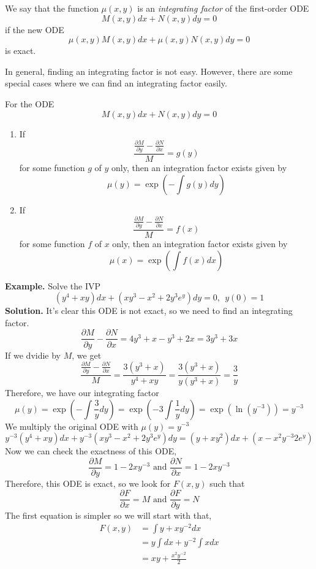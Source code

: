 \documentclass[openany]{report}
\begin{document}
\begin{definition}
    We say that the function $\mu(x,y)$ is an \emph{integrating factor} of the first-order ODE 
    \[M(x,y)dx + N(x,y)dy = 0\]
    if the new ODE
    \[\mu(x,y)M(x,y)dx + \mu(x,y)N(x,y)dy = 0\]
    is exact.
\end{definition}
In general, finding an integrating factor is not easy. However, there are some special cases where we can find an integrating factor easily.
\begin{theorem}
    For the ODE
    \[M(x,y)dx + N(x,y)dy = 0\]
    \begin{enumerate}
        \item If 
        \[\frac{\frac{\partial M}{\partial y} - \frac{\partial N}{\partial x}}{M} = g(y)\]
        for some function $g$ of $y$ only, then an integration factor exists given by 
        \[\mu(y) = \exp \left(-\int g(y)dy\right)\]
        \item If
        \[\frac{\frac{\partial M}{\partial y} - \frac{\partial N}{\partial x}}{M} = f(x)\]
        for some function $f$ of $x$ only, then an integration factor exists given by
        \[\mu(x) = \exp\left(\int f(x)dx\right)\]
    \end{enumerate}
\end{theorem}
\textbf{Example.} Solve the IVP 
\[(y^4 + xy)dx + (xy^3 - x^2 + 2y^3e^y)dy = 0, \ \ y(0) = 1\]
\textbf{Solution.} It's clear this ODE is not exact, so we need to find an integrating factor. 
\[\frac{\partial M}{\partial y} - \frac{\partial N}{\partial x} = 4y^3 + x - y^3 + 2x = 3y^3 + 3x\]
If we dvidie by $M$, we get 
\[\frac{\frac{\partial M}{\partial y} - \frac{\partial N}{\partial x}}{M} = \frac{3(y^3 + x)}{y^4 + xy} = \frac{3(y^3 + x)}{y(y^3 + x)} = \frac{3}{y}\]
Therefore, we have our integrating factor 
\[\mu(y) = \exp \left(-\int \frac{3}{y}dy\right) = \exp\left(-3\int\frac{1}{y}dy\right) = \exp\left(\ln(y^{-3})\right) = y^{-3}\]
We multiply the original ODE with $\mu(y) = y^{-3}$
\[y^{-3}(y^4 + xy)dx + y^{-3}(xy^3 - x^2 + 2y^3e^y)dy = (y + xy^2)dx + (x - x^2y^{-3}2e^y)\]
Now we can check the exactness of this ODE, 
\[\frac{\partial M}{\partial y} = 1 - 2xy^{-3} \text{ and } \frac{\partial N}{\partial x} = 1-2xy^{-3}\]
Therefore, this ODE is exact, so we look for $F(x,y)$ such that
\[\frac{\partial F}{\partial x} = M \text{ and } \frac{\partial F}{\partial y} = N\]
The first equation is simpler so we will start with that,
\begin{align*}
    F(x,y) &= \int y + xy^{-2}dx\\
    &= y \int dx + y^{-2}\int xdx\\
    &= xy + \frac{x^2y^{-2}}{2}
\end{align*}
\end{document}
